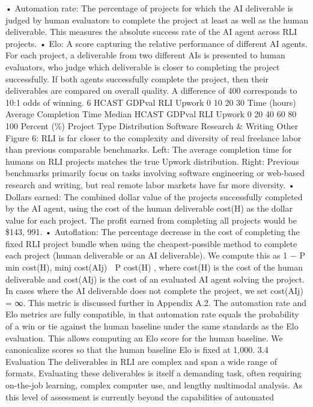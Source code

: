 • Automation rate: The percentage of projects for which the AI deliverable is judged by
human evaluators to complete the project at least as well as the human deliverable. This
measures the absolute success rate of the AI agent across RLI projects.
• Elo: A score capturing the relative performance of different AI agents. For each project,
a deliverable from two different AIs is presented to human evaluators, who judge which
deliverable is closer to completing the project successfully. If both agents successfully
complete the project, then their deliverables are compared on overall quality. A difference
of 400 corresponds to 10:1 odds of winning.
6
HCAST GDPval
RLI
Upwork
0
10
20
30
Time (hours)
Average Completion Time
Median
HCAST GDPval
RLI
Upwork
0
20
40
60
80
100
Percent (\%)
Project Type Distribution
Software
Research \& Writing
Other
Figure 6: RLI is far closer to the complexity and diversity of real freelance labor than previous
comparable benchmarks. Left: The average completion time for humans on RLI projects matches the
true Upwork distribution. Right: Previous benchmarks primarily focus on tasks involving software
engineering or web-based research and writing, but real remote labor markets have far more diversity.
• Dollars earned: The combined dollar value of the projects successfully completed by the
AI agent, using the cost of the human deliverable cost(H) as the dollar value for each
project. The profit earned from completing all projects would be \$143, 991.
• Autoflation: The percentage decrease in the cost of completing the fixed RLI project bundle
when using the cheapest-possible method to complete each project (human deliverable or
an AI deliverable). We compute this as 1 −
P min
 cost(H), minj cost(AIj)

P cost(H)
, where cost(H)
is the cost of the human deliverable and cost(AIj) is the cost of an evaluated AI agent
solving the project. In cases where the AI deliverable does not complete the project, we set
cost(AIj) = ∞. This metric is discussed further in Appendix A.2.
The automation rate and Elo metrics are fully compatible, in that automation rate equals the probability
of a win or tie against the human baseline under the same standards as the Elo evaluation. This allows
computing an Elo score for the human baseline. We canonicalize scores so that the human baseline
Elo is fixed at 1,000.
3.4
Evaluation
The deliverables in RLI are complex and span a wide range of formats. Evaluating these deliverables
is itself a demanding task, often requiring on-the-job learning, complex computer use, and lengthy
multimodal analysis. As this level of assessment is currently beyond the capabilities of automated
